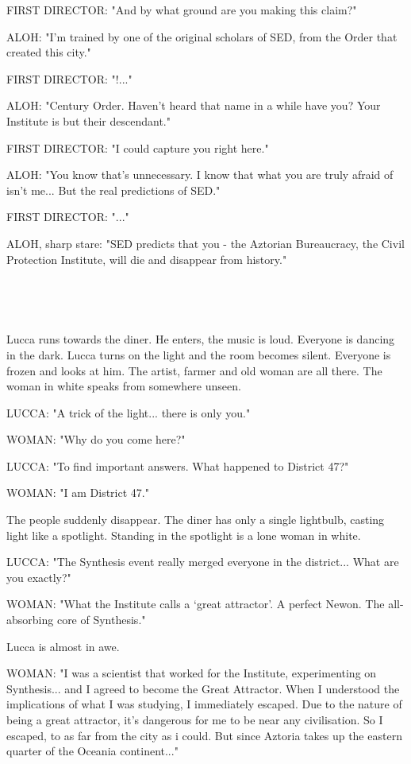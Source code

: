 \documentclass[11pt]{article}
\begin{document}
FIRST DIRECTOR: "And by what ground are you making this claim?"

ALOH: "I'm trained by one of the original scholars of SED, from the Order that created this city."

FIRST DIRECTOR: "!..."

ALOH: "Century Order. Haven't heard that name in a while have you?
Your Institute is but their descendant."

FIRST DIRECTOR: "I could capture you right here."

ALOH: "You know that's unnecessary.
I know that what you are truly afraid of isn't me...
But the real predictions of SED."

FIRST DIRECTOR: "..."

ALOH, sharp stare: "SED predicts that you - the Aztorian Bureaucracy, the Civil Protection Institute, will die and disappear from history."

\ 

\ 

Lucca runs towards the diner.
He enters, the music is loud.
Everyone is dancing in the dark.
Lucca turns on the light and the room becomes silent. 
Everyone is frozen and looks at him.
The artist, farmer and old woman are all there.
The woman in white speaks from somewhere unseen.

LUCCA: "A trick of the light... there is only you."

WOMAN: "Why do you come here?"

LUCCA: "To find important answers.
What happened to District 47?"

WOMAN: "I am District 47."

The people suddenly disappear.
The diner has only a single lightbulb, casting light like a spotlight.
Standing in the spotlight is a lone woman in white.

LUCCA: "The Synthesis event really merged everyone in the district...
What are you exactly?"

WOMAN: "What the Institute calls a `great attractor'.
A perfect Newon.
The all-absorbing core of Synthesis."

Lucca is almost in awe.

WOMAN: "I was a scientist that worked for the Institute, experimenting on Synthesis... and I agreed to become the Great Attractor.
When I understood the implications of what I was studying, I immediately escaped. 
Due to the nature of being a great attractor, it's dangerous for me to be near any civilisation.
So I escaped, to as far from the city as i could.
But since Aztoria takes up the eastern quarter of the Oceania continent..."
\end{document}
